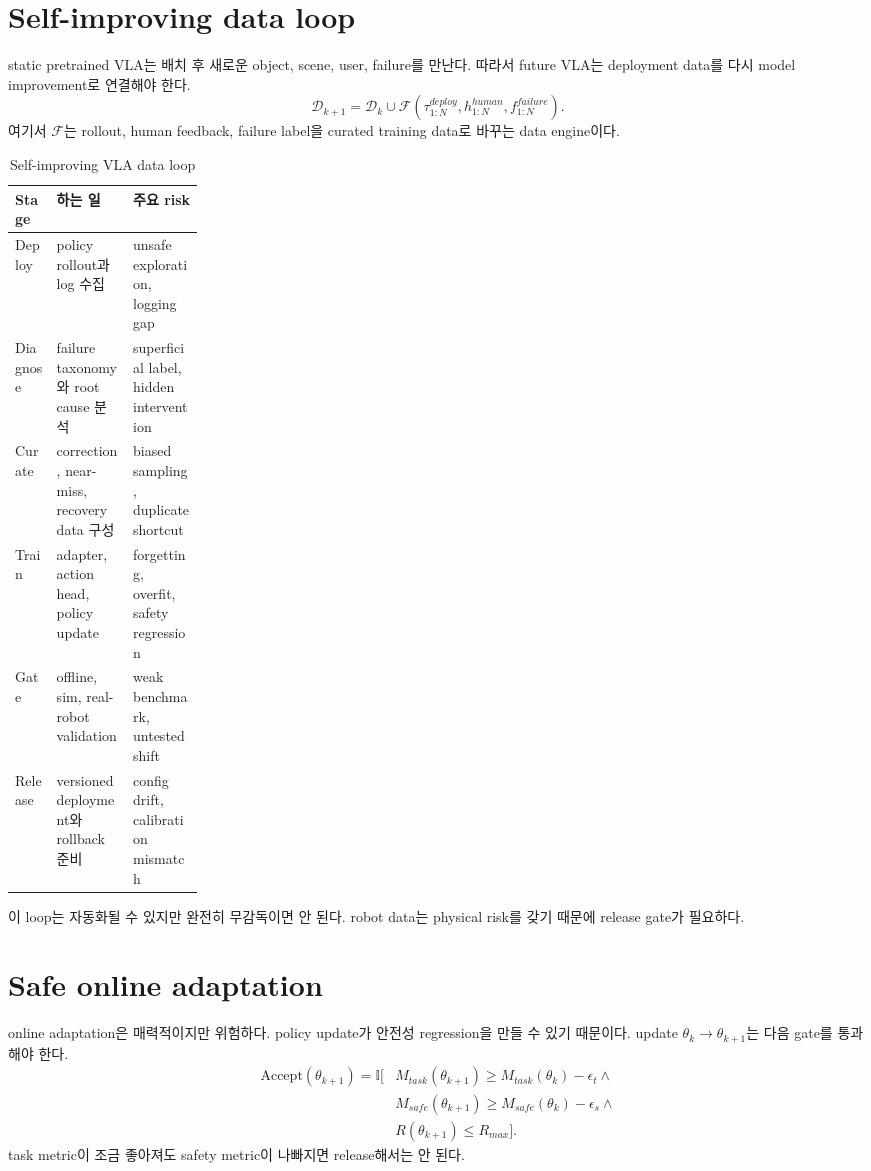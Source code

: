 \section{Self-improving data loop}

static pretrained VLA는 배치 후 새로운 object, scene, user, failure를 만난다. 따라서 future VLA는 deployment data를 다시 model improvement로 연결해야 한다.
\begin{equation}
  \mathcal{D}_{k+1}
  =
  \mathcal{D}_{k}
  \cup
  \mathcal{F}
  (
  \tau_{1:N}^{deploy},
  h_{1:N}^{human},
  f_{1:N}^{failure}
  ).
  \label{eq:ch22-data-loop}
\end{equation}
여기서 $\mathcal{F}$는 rollout, human feedback, failure label을 curated training data로 바꾸는 data engine이다.

\begin{table}[h]
  \centering
  \caption{Self-improving VLA data loop}
  \begin{tabularx}{\linewidth}{p{0.22\linewidth}X X}
    \toprule
    Stage & 하는 일 & 주요 risk \\
    \midrule
    Deploy & policy rollout과 log 수집 & unsafe exploration, logging gap \\
    Diagnose & failure taxonomy와 root cause 분석 & superficial label, hidden intervention \\
    Curate & correction, near-miss, recovery data 구성 & biased sampling, duplicate shortcut \\
    Train & adapter, action head, policy update & forgetting, overfit, safety regression \\
    Gate & offline, sim, real-robot validation & weak benchmark, untested shift \\
    Release & versioned deployment와 rollback 준비 & config drift, calibration mismatch \\
    \bottomrule
  \end{tabularx}
  \label{tab:ch22-data-loop}
\end{table}

이 loop는 자동화될 수 있지만 완전히 무감독이면 안 된다. robot data는 physical risk를 갖기 때문에 release gate가 필요하다.

\section{Safe online adaptation}

online adaptation은 매력적이지만 위험하다. policy update가 안전성 regression을 만들 수 있기 때문이다. update $\theta_k \rightarrow \theta_{k+1}$는 다음 gate를 통과해야 한다.
\begin{equation}
  \begin{aligned}
  \mathrm{Accept}(\theta_{k+1})
  =
  \mathbb{I}
  [&
  M_{task}(\theta_{k+1}) \geq M_{task}(\theta_k)-\epsilon_t
  \wedge\\
  &
  M_{safe}(\theta_{k+1}) \geq M_{safe}(\theta_k)-\epsilon_s
  \wedge\\
  &
  R(\theta_{k+1}) \leq R_{max}
  ].
  \end{aligned}
  \label{eq:ch22-release-gate}
\end{equation}
task metric이 조금 좋아져도 safety metric이 나빠지면 release해서는 안 된다.

